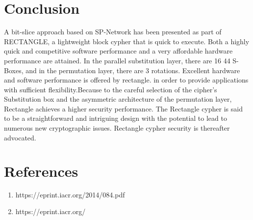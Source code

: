 \documentclass[journal=tosc,preprint]{iacrtrans}
\begin{document}
\section{Conclusion}
A bit-slice approach based on SP-Network has been presented as part of RECTANGLE, a lightweight block cypher that is quick to execute. Both a highly quick and competitive software performance and a very affordable hardware performance are attained. In the parallel substitution layer, there are 16 44 S-Boxes, and in the permutation layer, there are 3 rotations. Excellent hardware and software performance is offered by rectangle. in order to provide applications with sufficient flexibility.Because to the careful selection of the cipher's Substitution box and the asymmetric architecture of the permutation layer, Rectangle achieves a higher security performance. The Rectangle cypher is said to be a straightforward and intriguing design with the potential to lead to numerous new cryptographic issues. Rectangle cypher security is thereafter advocated.

\section{References}
\begin{enumerate}
    \item https://eprint.iacr.org/2014/084.pdf
    \item https://eprint.iacr.org/
\end{enumerate}




\end{document}
